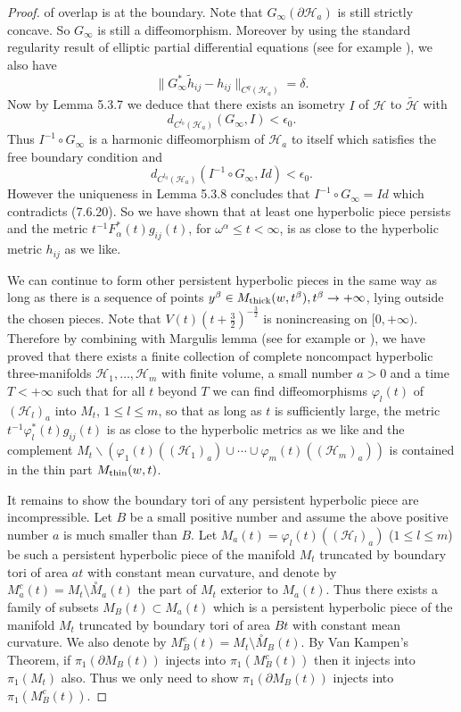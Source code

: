 \begin{proof}
of overlap is at the boundary. Note that $G_{\infty}(\partial
\mathcal{H}_a)$ is still strictly concave. So $G_{\infty}$ is
still a diffeomorphism. Moreover by using the standard regularity
result of elliptic partial differential equations (see for example
\cite{GT}), we also have \begin{equation}
\|G^*_{\infty}\widetilde{h}_{ij}-h_{ij}
\|_{C^q(\mathcal{H}_a)}=\delta. %
\end{equation} Now by Lemma 5.3.7 we deduce that there exists an isometry $I$
of $\mathcal{H}$ to $\widetilde{\mathcal{H}}$ with
$$
d_{C^{l_0}(\mathcal{H}_a)}(G_{\infty},I)<\epsilon_0.
$$
Thus $I^{-1}\circ G_{\infty} $ is a harmonic diffeomorphism of
$\mathcal{H}_a$ to itself which satisfies the free boundary
condition and
$$
d_{C^{l_0}(\mathcal{H}_a)}(I^{-1}\circ G_{\infty},Id)<\epsilon_0.
$$
However the uniqueness in Lemma 5.3.8 concludes that $I^{-1}\circ
G_{\infty}=Id$ which contradicts (7.6.20). So we have shown that
at least one hyperbolic piece persists and the metric
$t^{-1}F^*_{\alpha}(t)g_{ij}(t)$, for $\omega^{\alpha}\leq
t<\infty$, is as close to the hyperbolic metric $h_{ij}$ as we
like.

We can continue to form other persistent hyperbolic pieces in the
same way as long as there is a sequence of points $y^{\beta}\in
M_{\rm thick}(w,t^{\beta}),t^{\beta}\rightarrow+\infty$, lying
outside the chosen pieces. Note that
$V(t)(t+\frac{3}{2})^{-\frac{3}{2}}$ is nonincreasing on
$[0,+\infty)$. Therefore by combining with Margulis lemma (see for
example \cite{Gro79} or \cite{KM}), we have proved that there
exists a finite collection of complete noncompact hyperbolic
three-manifolds $\mathcal{H}_1,\ldots,\mathcal{H}_m$ with finite
volume, a small number $a>0$ and a time $T<+\infty$ such that for
all $t$ beyond $T$ we can find diffeomorphisms $\varphi_l(t)$ of
$(\mathcal{H}_l)_a$ into $M_t$, $1\leq l\leq m$, so that as long
as $t$ is sufficiently large, the metric
$t^{-1}\varphi^*_l(t)g_{ij}(t)$ is as close to the hyperbolic
metrics as we like and the complement $M_t\backslash
(\varphi_1(t)((\mathcal{H}_1)_a)\cup\cdots\cup
\varphi_m(t)((\mathcal{H}_m)_a))$ is contained in the thin part
$M_{\rm thin}(w,t)$.

It remains to show the boundary tori of any persistent hyperbolic
piece are incompressible. Let $B$ be a small positive number and
assume the above positive number $a$ is much smaller than $B$. Let
$M_a(t)=\varphi_l(t)((\mathcal{H}_l)_a)$ ($1\leq l\leq m$) be such
a persistent hyperbolic piece of the manifold $M_t$ truncated by
boundary tori of area $at$ with constant mean curvature, and
denote by $M^c_a(t)=M_t\setminus \stackrel{\circ}{M}_a(t)$ the
part of $M_t$ exterior to $M_a(t)$. Thus there exists a family of
subsets $M_B(t)\subset M_a(t)$ which is a persistent hyperbolic
piece of the manifold $M_t$ truncated by boundary tori of area
$Bt$ with constant mean curvature. We also denote by
$M^c_B(t)=M_t\setminus \stackrel{\circ}{M}_B(t)$. By Van Kampen's
Theorem, if $\pi_1(\partial M_B(t))$ injects into
$\pi_1(M_B^c(t))$ then it injects into $\pi_1(M_t)$ also. Thus we
only need to show $\pi_1(\partial M_B(t))$ injects into
$\pi_1(M_B^c(t))$.


\end{proof}
